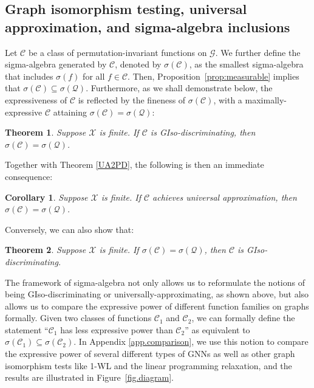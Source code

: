 \documentclass{article}
\newtheorem{theorem}{Theorem}
\newtheorem{corollary}{Corollary}
\def\Gfun{\mathcal{G}}
\def\Qfun{\mathcal{Q}}
\begin{document}
\subsection{Graph isomorphism testing, universal approximation, and sigma-algebra inclusions}
\label{sec.reformulating}
Let $\mathcal{C}$ be a class of permutation-invariant functions on $\Gfun$. We further define the sigma-algebra generated by $\mathcal{C}$, denoted by $\sigma(\mathcal{C})$, as the smallest sigma-algebra that includes $\sigma(f)$ for all $f \in \mathcal{C}$. Then, Proposition~\ref{prop:measurable} implies that $\sigma(\mathcal{C}) \subseteq \sigma(\Qfun)$. Furthermore, as we shall demonstrate below, the expressiveness of $\mathcal{C}$ is reflected by the fineness of $\sigma(\mathcal{C})$, with a maximally-expressive $\mathcal{C}$ attaining $\sigma(\mathcal{C}) = \sigma(\Qfun)$:
\begin{theorem}\label{teo5}
Suppose $\mathcal{X}$ is finite. If $\mathcal{C}$ is GIso-discriminating, then $\sigma(\mathcal{C}) = \sigma(\Qfun)$.
\end{theorem}
Together with Theorem \ref{UA2PD}, the following is then an immediate consequence:
\begin{corollary}
Suppose $\mathcal{X}$ is finite. If $\mathcal{C}$ achieves universal approximation, then $\sigma(\mathcal{C}) = \sigma(\Qfun)$.
\end{corollary}
Conversely, we can also show that:
\begin{theorem} \label{teo6}
Suppose $\mathcal{X}$ is finite. If $\sigma(\mathcal{C}) = \sigma(\Qfun)$, then $\mathcal{C}$ is GIso-discriminating.
\end{theorem}


The framework of sigma-algebra not only allows us to reformulate the notions of being GIso-discriminating or universally-approximating, as shown above, but also allows us to compare the expressive power of different function families on graphs formally.
Given two classes of functions $\mathcal{C}_1$ and $\mathcal{C}_2$, we can formally define the statement ``$\mathcal{C}_1$ has less expressive power than $\mathcal{C}_2$'' as equivalent to $\sigma(\mathcal{C}_1) \subseteq \sigma(\mathcal{C}_2)$.
In Appendix \ref{app.comparison}, we use this notion to compare the expressive power of several different types of GNNs as well as other graph isomorphism tests like 1-WL and the linear programming relaxation, and the results are illustrated in Figure~\ref{fig.diagram}.
\end{document}

